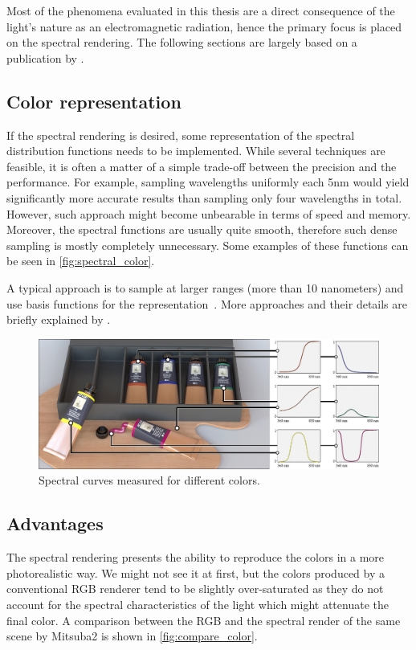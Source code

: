Most of the phenomena evaluated in this thesis are a direct consequence of the light's nature as an electromagnetic radiation, hence the primary focus is placed on the spectral rendering.
The following sections are largely based on a publication by \citet{wilkie2002tone}.

\subsection{Color representation}

If the spectral rendering is desired, some representation of the spectral distribution functions needs to be implemented. While several techniques are feasible, it is often a matter of a simple trade-off between the precision and the performance. For example, sampling wavelengths uniformly each 5nm would yield significantly more accurate results than sampling only four wavelengths in total. However, such approach might become unbearable in terms of speed and memory. Moreover, the spectral functions are usually quite smooth, therefore such dense sampling is mostly completely unnecessary. Some examples of these functions can be seen in \autoref{fig:spectral_color}.

A typical approach is to sample at larger ranges (more than 10 nanometers) and use basis functions for the representation~\cite{peercy1993linear}. More approaches and their details are briefly explained by \citet{wilkie2002tone}.

\begin{figure}[httpb]
	\centering
	\includegraphics[width=.9\linewidth]{img/spectral_color.jpg}
	\caption{Spectral curves measured for different colors\cite{jakob2019low}.}
	\label{fig:spectral_color}
\end{figure}

\subsection{Advantages}

The spectral rendering presents the ability to reproduce the colors in a more photorealistic way. We might not see it at first, but the colors produced by a conventional RGB renderer tend to be slightly over-saturated as they do not account for the spectral characteristics of the light which might attenuate the final color. A comparison between the RGB and the spectral render of the same scene by Mitsuba2 is shown in \autoref{fig:compare_color}.

